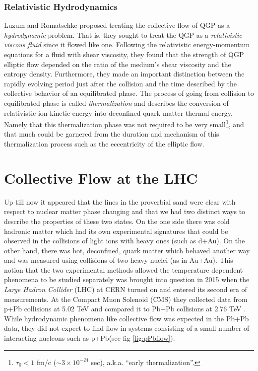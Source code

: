 \subsubsection{Relativistic Hydrodynamics}
Luzum and Romatschke \citep{PhysRevC.78.034915} proposed treating the collective flow of QGP as a \textit{hydrodynamic} problem. That is, they sought to treat the QGP as a \textit{relativistic viscous fluid} since it flowed like one. Following the relativistic energy-momentum equations for a fluid with shear viscosity, they found that the strength of QGP elliptic flow depended on the ratio of the medium's shear viscosity and the entropy density. Furthermore, they made an important distinction between the rapidly evolving period just after the collision and the time described by the collective behavior of an equilibrated phase. The process of going from collision to equilibrated phase is called \textit{thermalization} and describes the conversion of relativistic ion kinetic energy into deconfined quark matter thermal energy. Namely that this thermalization phase was not required to be very small\footnote{$\tau_0 < 1$ fm/c ($\sim 3 \times 10^{-24}$ sec), a.k.a. ``early thermalization''.}, and that much could be garnered from the duration and mechanism of this thermalization process such as the eccentricity of the elliptic flow.

\section{Collective Flow at the LHC}
Up till now it appeared that the lines in the proverbial sand were clear with respect to nuclear matter phase changing and that we had two distinct ways to describe the properties of these two states. On the one side there was cold hadronic matter which had its own experimental signatures that could be observed in the collisions of light ions with heavy ones (such as d+Au). On the other hand, there was hot, deconfined, quark matter which behaved another way and was measured using collisions of two heavy nuclei (as in Au+Au). This notion that the two experimental methods allowed the temperature dependent phenomena to be studied separately was brought into question in 2015 when the \textit{Large Hadron Collider} (LHC) at CERN turned on and entered its second era of measurements. At the Compact Muon Solenoid (CMS) they collected data from p+Pb collisions at 5.02 TeV and compared it to Pb+Pb collisions at 2.76 TeV \citep{Khachatryan:2015waa}. While hydrodynamic phenomena like collective flow was expected in the Pb+Pb data, they did not expect to find flow in systems consisting of a small number of interacting nucleons such as p+Pb(see fig \ref{fig:pPbflow}).
 

